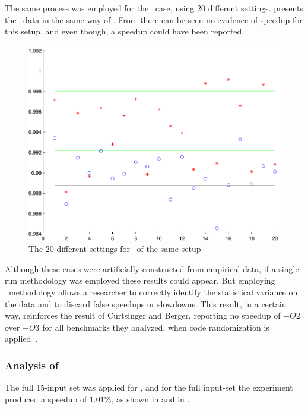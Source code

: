 The same process was employed for the \gzip\ case, using $20$ different settings.  presents the \gzip\ data in the same way of . From  there can be seen no evidence of speedup for this setup, and even though, a speedup could have been reported.

\begin{figure}
  \centering
  \includegraphics[width=1.00\linewidth]{Figures/gzipfdll}
  \caption{The $20$ different settings for \gzip\ of the same setup}
  \label{fig:gzipfdll}
\end{figure}

Although these cases were artificially constructed from empirical data, if a single-run methodology was employed these results could appear. But employing \CP\ methodology allows a researcher to correctly identify the statistical variance on the data and to discard false speedups or slowdowns. This result, in a certain way, reinforces the result of Curtsinger and Berger, reporting no speedup of $-O2$ over $-O3$ for all benchmarks they analyzed, when code randomization is applied~\cite{Curtsinger2013}.


\subsubsection{Analysis of \gobmk}

The full 15-input set was applied for \gobmk, and for the full input-set the experiment produced a speedup of $1.01 \%$, as shown in  and in .

